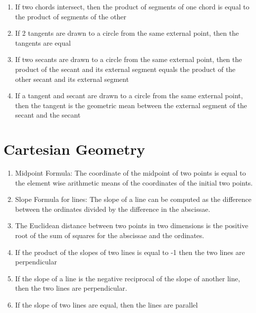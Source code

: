 \documentclass[11pt,letterpaper]{report}
\begin{document}
\begin{enumerate}
    \item If two chords intersect, then the product of segments of one chord is equal to the product of segments of the other
    \item If 2 tangents are drawn to a circle from the same external point, then the tangents are equal
    \item If two secants are drawn to a circle from the same external point, then the product of the secant and its external segment equals the product of the other secant and its external segment
    \item If a tangent and secant are drawn to a circle from the same external point, then the tangent is the geometric mean between the external segment of the secant and the secant
\end{enumerate}

\section*{Cartesian Geometry}
\begin{enumerate}
    \item Midpoint Formula: The coordinate of the midpoint of two points is equal to the element wise arithmetic means of the coordinates of the initial two points.
    \item Slope Formula for lines: The slope of a line can be computed as the difference between the ordinates divided by the difference in the abscissae.
    \item The Euclidean distance between two points in two dimensions is the positive root of the sum of squares for the abscissae and the ordinates.
    \item If the product of the slopes of two lines is equal to -1 then the two lines are perpendicular
    \item If the slope of a line is the negative reciprocal of the slope of another line, then the two lines are perpendicular.
    \item If the slope of two lines are equal, then the lines are parallel
\end{enumerate}
\newpage
\end{document}
